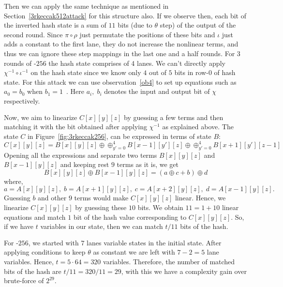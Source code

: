 Then we can apply the same technique as mentioned in Section~\ref{3rkeccak512attack} for this structure also. If we observe then, each bit of the inverted hash state is a sum of $11$ bits (due to $\theta$ step) of the output of the second round. Since $\pi \circ \rho$ just permutate the positions of these bits and $\iota$ just adds a constant to the first lane, they do not increase the nonlinear terms, and thus we can ignore these step mappings in the last one and a half rounds. For $3$ rounds of \Keccak-$256$ the hash state comprises of 4 lanes. We can't directly apply $\chi^{-1} \circ \iota^{-1}$ on the hash state since we know only $4$ out of $5$ bits in row-$0$ of hash state. For this attack we can use observation~\ref{ob4} to set up equations such as $a_0 = b_0$ when $b_1 = 1$~\cite{guo2016linear}. Here $a_i,\;b_i$ denotes the input and output bit of $\chi$ respectively. 

Now, we aim to linearize $C[x][y][z]$ by guessing a few terms and then matching it with the bit obtained after applying $\chi^{-1}$ as explained above.
The state $C$ in Figure~\ref{fig:3rkeccak256}, can be expressed in terms of state $B$:
\begin{equation}
  C[x][y][z] = B[x][y][z] \oplus \oplus_{y' = 0}^{4} B[x-1][y'][z] \oplus \oplus_{y' = 0}^{4} B[x+1][y'][z-1]
\end{equation}
Opening all the expressions and separate two terms $B[x][y][z]$ and $B[x-1][y][z]$ and keeping rest $9$ terms as it is, we get 
\begin{equation}
B[x][y][z] \oplus B[x-1][y][z] = (a \oplus c + b) \oplus d
\end{equation} 
where,
\begin{equation}
    a = A[x][y][z],\; b = A[x + 1][y][z],\; c = A[x + 2][y][z],\; d = A[x - 1][y][z].
\end{equation}
Guessing $b$ and other $9$ terms would make $C[x][y][z]$ linear. Hence, we linearize $C[x][y][z]$ by guessing these $10$ bits. We obtain $11 = 1 + 10$ linear equations and match $1$ bit of the hash value corresponding to $C[x][y][z]$. So, if we have $t$ variables in our state, then we can match $t/11$ bits of the hash.

For \Keccak-$256$, we started with $7$ lanes variable states in the initial state. After applying conditions to keep $\theta$ as constant we are left with $7 - 2 = 5$ lane variables. Hence, $t = 5 \cdot 64 = 320$ variables.
Therefore, the number of matched bits of the hash are $t/11 = 320/11 = 29$, with this we have a complexity gain over brute-force of $2^{29}$.

